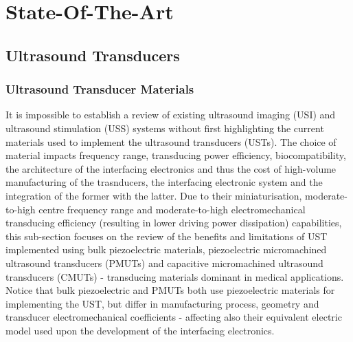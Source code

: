
%

\makeatletter
\newcommand{\ntifpkgloaded}{%
  \@ifpackageloaded%
}
\makeatother

\chapter{State-Of-The-Art}
\label{cha:state_of_the_art}


\section{Ultrasound Transducers}
\label{sec:ultrasound_transducers}

\subsection{Ultrasound Transducer Materials}
\label{subsec:ultrasound_trasnducer_materials}

It is impossible to establish a review of existing ultrasound imaging (USI) and ultrasound stimulation (USS) systems without first highlighting the current materials used to implement the ultrasound transducers (USTs). The choice of material impacts frequency range, transducing power efficiency, biocompatibility, the architecture of the interfacing electronics and thus the cost of high-volume manufacturing of the trasnducers, the interfacing electronic system and the integration of the former with the latter. Due to their miniaturisation, moderate-to-high centre frequency range and moderate-to-high electromechanical transducing efficiency (resulting in lower driving power dissipation) capabilities, this sub-section focuses on the review of the benefits and limitations of UST implemented using bulk piezoelectric materials, piezoelectric micromachined ultrasound transducers (PMUTs) and capacitive micromachined ultrasound transducers (CMUTs) - transducing materials dominant in medical applications. Notice that bulk piezoelectric and PMUTs both use piezoelectric materials for implementing the UST, but differ in manufacturing process, geometry and transducer electromechanical coefficients - affecting also their equivalent electric model used upon the development of the interfacing electronics.

